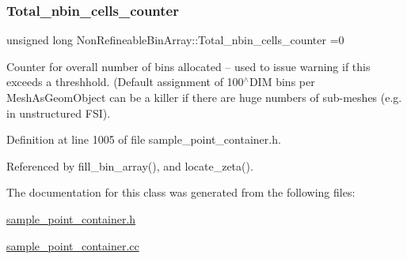 \subsubsection{\texorpdfstring{Total\+\_\+nbin\+\_\+cells\+\_\+counter}{Total\_nbin\_cells\_counter}}
{\footnotesize\ttfamily unsigned long Non\+Refineable\+Bin\+Array\+::\+Total\+\_\+nbin\+\_\+cells\+\_\+counter =0\hspace{0.3cm}{\ttfamily [static]}}



Counter for overall number of bins allocated -- used to issue warning if this exceeds a threshhold. (Default assignment of 100$^\wedge$\+D\+IM bins per Mesh\+As\+Geom\+Object can be a killer if there are huge numbers of sub-\/meshes (e.\+g. in unstructured F\+SI). 



Definition at line 1005 of file sample\+\_\+point\+\_\+container.\+h.



Referenced by fill\+\_\+bin\+\_\+array(), and locate\+\_\+zeta().



The documentation for this class was generated from the following files\+:\begin{DoxyCompactItemize}
\item 
\hyperlink{sample__point__container_8h}{sample\+\_\+point\+\_\+container.\+h}\item 
\hyperlink{sample__point__container_8cc}{sample\+\_\+point\+\_\+container.\+cc}\end{DoxyCompactItemize}
